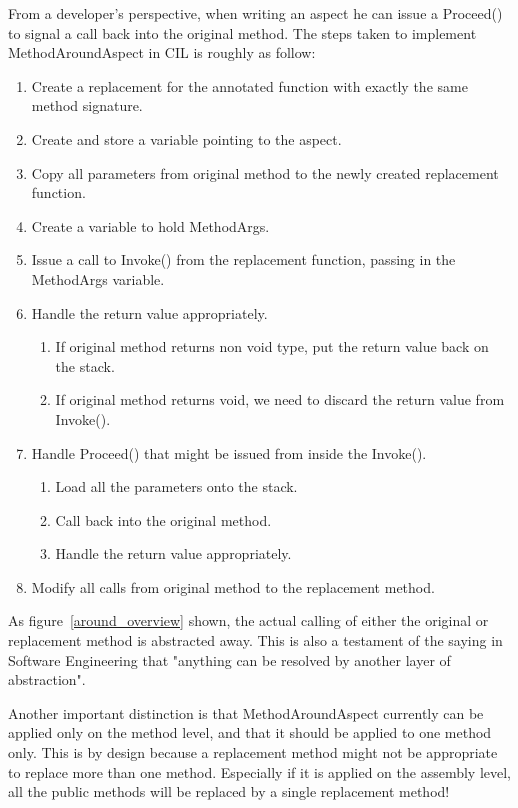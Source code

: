 From a developer’s perspective, when writing an aspect he can issue a Proceed() to signal a call back into the original method. The steps taken to implement MethodAroundAspect in CIL is roughly as follow:

\begin{enumerate}
	\item Create a replacement for the annotated function with exactly the same method signature.
	\item Create and store a variable pointing to the aspect.
	\item Copy all parameters from original method to the newly created replacement function.
	\item Create a variable to hold MethodArgs.
	\item Issue a call to Invoke() from the replacement function, passing in the MethodArgs variable.
	\item Handle the return value appropriately.
	\begin{enumerate}
		\item If original method returns non void type, put the return value back on the stack.
		\item If original method returns void, we need to discard the return value from Invoke().
	\end{enumerate}
	\item Handle Proceed() that might be issued from inside the Invoke().
	\begin{enumerate}
		\item Load all the parameters onto the stack.
		\item Call back into the original method.
		\item Handle the return value appropriately.
	\end{enumerate}
	\item Modify all calls from original method to the replacement method.
\end{enumerate}

As figure~\ref{around_overview} shown, the actual calling of either the original or replacement method is abstracted away. This is also a testament of the saying in Software Engineering that "anything can be resolved by another layer of abstraction".

Another important distinction is that MethodAroundAspect currently can be applied only on the method level, and that it should be applied to one method only. This is by design because a replacement method might not be appropriate to replace more than one method. Especially if it is applied on the assembly level, all the public methods will be replaced by a single replacement method!

